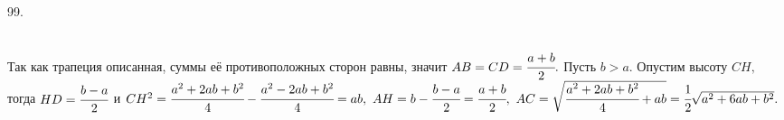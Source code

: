 99. \begin{figure}[ht!]
\end{figure}\\
Так как трапеция описанная, суммы её противоположных сторон равны, значит $AB=CD=\cfrac{a+b}{2}.$ Пусть $b>a.$ Опустим высоту $CH,$ тогда $HD=\cfrac{b-a}{2}$ и $CH^2=\cfrac{a^2+2ab+b^2}{4}-\cfrac{a^2-2ab+b^2}{4}=ab,\ AH=b-\cfrac{b-a}{2}=\cfrac{a+b}{2},\ AC=\sqrt{\cfrac{a^2+2ab+b^2}{4}+ab}=\cfrac{1}{2}\sqrt{a^2+6ab+b^2}.$\newpage\noindent
